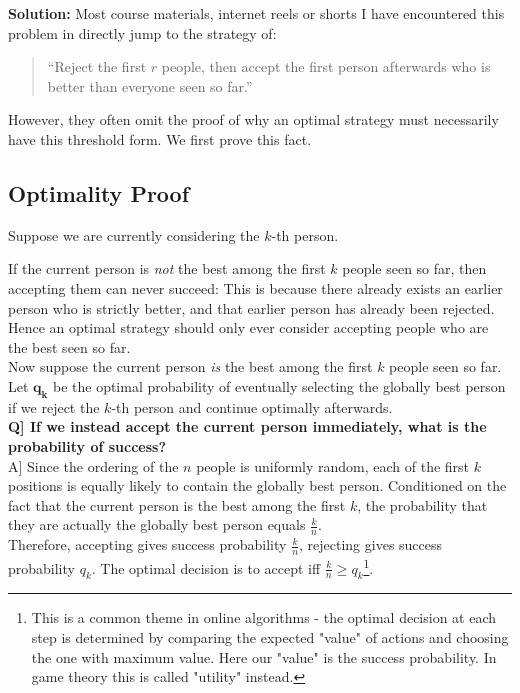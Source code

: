 \documentclass[11pt,openany]{book}
\begin{document}
\noindent\textbf{Solution:}
\noindent Most course materials, internet reels or shorts I have encountered this problem in 
directly jump to the strategy of:
\begin{quote}
``Reject the first \(r\) people, then accept the first person afterwards who is better than everyone seen so far.''
\end{quote}

\noindent However, they often omit the proof of why an optimal strategy must necessarily have this threshold form. We first prove this fact.

\subsection*{Optimality Proof}

Suppose we are currently considering the \(k\)-th person.

If the current person is \emph{not} the best among the first \(k\) people seen so far, then accepting them can never succeed:
This is because there already exists an earlier person who is strictly better, and that earlier person has already been rejected.
Hence an optimal strategy should only ever consider accepting people who are the best seen so far.\\


Now suppose the current person \emph{is} the best among the first \(k\) people seen so far. 
Let $\bm{q_k}$ be the optimal probability of eventually selecting the globally best person if we reject the $k$-th person and continue optimally afterwards.\\


\textbf{Q] If we instead accept the current person immediately, what is the probability of success?}\\


A] Since the ordering of the \(n\) people is uniformly random, each of the first \(k\) positions is equally likely to contain the globally best person. 
Conditioned on the fact that the current person is the best among the first \(k\), the probability that they are actually 
the globally best person equals $\frac{k}{n}$.\\

\vspace{0.4em}
\noindent Therefore, accepting gives success probability \(\frac{k}{n}\), rejecting gives success probability \(q_k\).
The optimal decision is to accept iff $\frac{k}{n} \ge q_k$\footnote{This is a 
common theme in online algorithms - the optimal decision at each step 
is determined by comparing the expected "value" of actions and choosing 
the one with maximum value. Here our "value" is the success probability. In 
game theory this is called "utility" instead.}. \\
\end{document}

